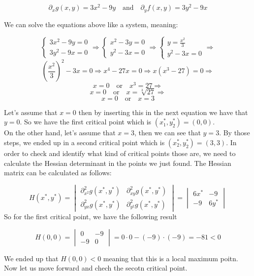 \documentclass[
]{article}
\begin{document}
\[
\partial_xg(x,y) = 3x^2 - 9y\quad\text{and}\quad\partial_yf(x,y) = 3y^2 -9x
\]

We can solve the equations above like a system, meaning:

\[
\begin{cases}
3x^2 - 9y = 0 \\
3y^2 -9x = 0
\end{cases} \Rightarrow
\begin{cases}
x^2 - 3y = 0 \\
y^2 - 3x = 0
\end{cases} \Rightarrow
\begin{cases}
y = \frac{x^2}{3}\\
y^2 - 3x = 0
\end{cases}\Rightarrow
\] \[
(\frac{x^2}{3})^2-3x=0\Rightarrow x^4-27x=0 \Rightarrow x(x^3-27)=0 \Rightarrow
\] \[
x = 0\quad \text{or}\quad x^3 = 27 \Rightarrow
\] \[
x = 0 \quad \text{or}\quad x = \sqrt[3]{27} \Rightarrow
\] \[
x=0 \quad \text{or} \quad x = 3
\]

Let's assume that \(x = 0\) then by inserting this in the next equation
we have that \(y = 0\). So we have the first critical point which is
\((x^*_1,y^*_2) = (0,0)\).\\
On the other hand, let's assume that \(x=3\), then we can see that
\(y = 3\). By those steps, we ended up in a second critical point which
is \((x_2^*,y_2^*)=(3,3)\). In order to check and identify what kind of
critical points those are, we need to calculate the Hessian determinant
in the points we just found. The Hessian matrix can be calculated as
follows:

\[
H(x^*,y^*)=\begin{vmatrix}
\partial^2_{x^2} g(x^*,y^*) & \partial_{xy}^2g(x^*,y^*) \\
\partial_{yx}^2g(x^*,y^*) & \partial^2_{y^2} g(x^*,y^*)
\end{vmatrix}=
\begin{vmatrix}
6x^* & -9 \\
-9 & 6y^*
\end{vmatrix}
\] So for the first critical point, we have the following result

\[
H(0,0)= \begin{vmatrix}
0 & -9\\
-9 & 0
\end{vmatrix}=0\cdot0 -(-9)\cdot(-9)=-81 <0
\]

We ended up that \(H(0,0)<0\) meaning that this is a local maximum
poitn. Now let us move forward and chech the secotn critical point.
\end{document}
